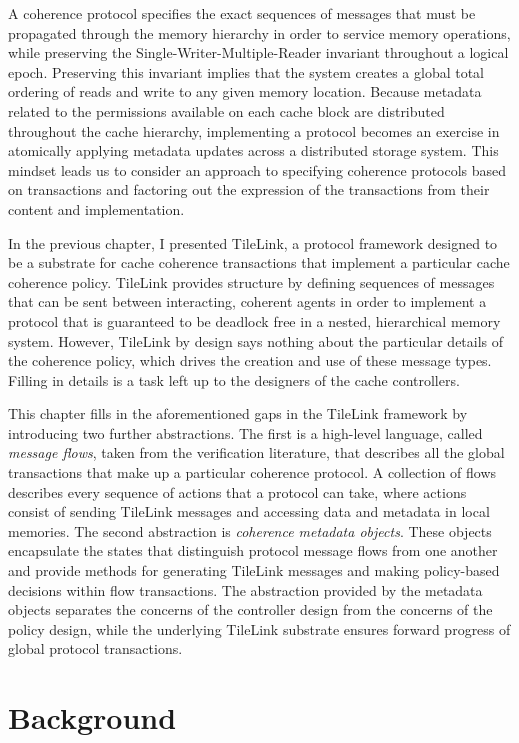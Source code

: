 A coherence protocol specifies the exact sequences of messages that must be propagated through the memory hierarchy in order to service memory operations,
while preserving the Single-Writer-Multiple-Reader invariant throughout a logical epoch.
Preserving this invariant implies that the system creates a global total ordering of reads and write to any given memory location.
Because metadata related to the permissions available on each cache block are distributed throughout the cache hierarchy,
implementing a protocol becomes an exercise in atomically applying metadata updates across a distributed storage system.
This mindset leads us to consider an approach to specifying coherence protocols based on transactions
and factoring out the expression of the transactions from their content and implementation.

In the previous chapter, I presented TileLink,
a protocol framework designed to be a substrate for cache coherence transactions that implement a particular cache coherence policy. 
TileLink provides structure by defining sequences of messages that can be sent between interacting, coherent agents in order
to implement a protocol that is guaranteed to be deadlock free in a nested, hierarchical memory system.
However, TileLink by design says nothing about the particular details of the coherence policy,
which drives the creation and use of these message types.
Filling in details is a task left up to the designers of the cache controllers.

This chapter fills in the aforementioned gaps in the TileLink framework by introducing two further abstractions.
The first is a high-level language,
called \emph{message flows},
taken from the verification literature, 
that describes all the global transactions that make up a particular coherence protocol.
A collection of flows describes every sequence of actions that a protocol can take,
where actions consist of sending TileLink messages and accessing  data and metadata in local memories.
The second abstraction is \emph{coherence metadata objects}.
These objects encapsulate the states that distinguish protocol message flows from one another
and provide methods for generating TileLink messages and making policy-based decisions within flow transactions.
The abstraction provided by the metadata objects separates the concerns of the controller design from the concerns of the policy design, 
while the underlying TileLink substrate ensures forward progress of global protocol transactions.

\section{Background} 

